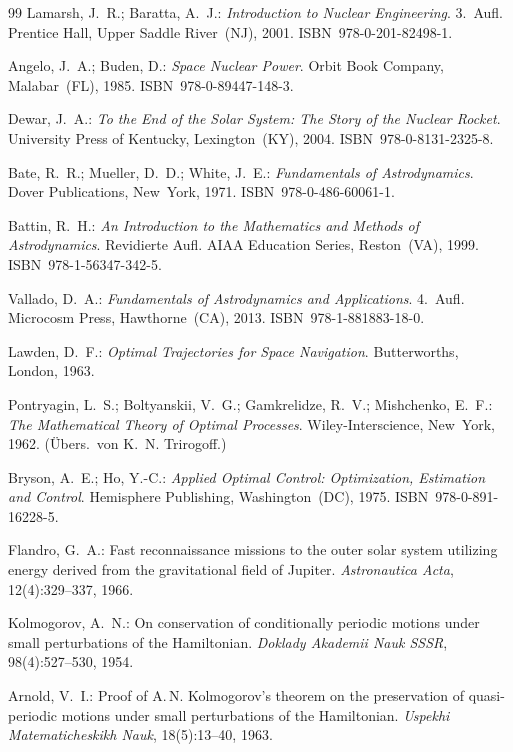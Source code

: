 ﻿\documentclass[a4paper,12pt,twoside]{article}
\theoremstyle{plain}
\theoremstyle{definition}
\theoremstyle{remark}
\begin{document}
\begin{thebibliography}{99}
	Lamarsh, J.~R.; Baratta, A.~J.:
	\textit{Introduction to Nuclear Engineering}.
	3.~Aufl. Prentice Hall, Upper Saddle River~(NJ), 2001.
	ISBN~978-0-201-82498-1.

	Angelo, J.~A.; Buden, D.:
	\textit{Space Nuclear Power}.
	Orbit Book Company, Malabar~(FL), 1985.
	ISBN~978-0-89447-148-3.

	Dewar, J.~A.:
	\textit{To the End of the Solar System: The Story of the Nuclear Rocket}.
	University Press of Kentucky, Lexington~(KY), 2004.
	ISBN~978-0-8131-2325-8.

	Bate, R.~R.; Mueller, D.~D.; White, J.~E.:
	\textit{Fundamentals of Astrodynamics}.
	Dover Publications, New~York, 1971.
	ISBN~978-0-486-60061-1.

	Battin, R.~H.:
	\textit{An Introduction to the Mathematics and Methods of Astrodynamics}.
	Revidierte Aufl. AIAA Education Series, Reston~(VA), 1999.
	ISBN~978-1-56347-342-5.

	Vallado, D.~A.:
	\textit{Fundamentals of Astrodynamics and Applications}.
	4.~Aufl. Microcosm Press, Hawthorne~(CA), 2013.
	ISBN~978-1-881883-18-0.

	Lawden, D.~F.:
	\textit{Optimal Trajectories for Space Navigation}.
	Butterworths, London, 1963.

	Pontryagin, L.~S.; Boltyanskii, V.~G.; Gamkrelidze, R.~V.;
	Mishchenko, E.~F.:
	\textit{The Mathematical Theory of Optimal Processes}.
	Wiley-Interscience, New~York, 1962.
	(Übers.\ von K.~N. Trirogoff.)

	Bryson, A.~E.; Ho, Y.-C.:
	\textit{Applied Optimal Control: Optimization, Estimation and Control}.
	Hemisphere Publishing, Washington~(DC), 1975.
	ISBN~978-0-891-16228-5.

	Flandro, G.~A.:
	Fast reconnaissance missions to the outer solar system utilizing energy
	derived from the gravitational field of Jupiter.
	\textit{Astronautica Acta}, 12(4):329--337, 1966.

	Kolmogorov, A.~N.:
	On conservation of conditionally periodic motions under small perturbations
	of the Hamiltonian.
	\textit{Doklady Akademii Nauk SSSR}, 98(4):527--530, 1954.

	Arnold, V.~I.:
	Proof of A.\,N. Kolmogorov's theorem on the preservation of quasi-periodic
	motions under small perturbations of the Hamiltonian.
	\textit{Uspekhi Matematicheskikh Nauk}, 18(5):13--40, 1963.


\end{thebibliography}
\end{document}
